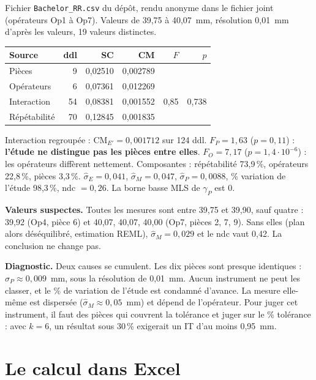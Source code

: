 \documentclass[11pt,a4paper]{article}
\theoremstyle{sj}
\theoremstyle{definition}
\theoremstyle{remark}
\newcommand{\CM}{\mathrm{CM}}
\newcommand{\gP}{\gamma_P}
\begin{document}
Fichier \texttt{Bachelor\_RR.csv} du dépôt, rendu anonyme dans le fichier joint  (opérateurs Op1 à Op7). Valeurs de 39,75 à 40,07~mm, résolution 0,01~mm d'après les valeurs, 19 valeurs distinctes.

\begin{center}
\begin{tabular}{l r r r r r}
\toprule
Source & ddl & SC & CM & $F$ & $p$\\
\midrule
Pièces & 9 & 0,02510 & 0,002789 & &\\
Opérateurs & 6 & 0,07361 & 0,012269 & &\\
Interaction & 54 & 0,08381 & 0,001552 & 0,85 & 0,738\\
Répétabilité & 70 & 0,12845 & 0,001835 & &\\
\bottomrule
\end{tabular}
\end{center}

Interaction regroupée : $\CM_{E'}=0{,}001712$ sur 124 ddl. $F_P=1{,}63$ ($p=0{,}11$) : \textbf{l'étude ne distingue pas les pièces entre elles}. $F_O=7{,}17$ ($p=1{,}4\cdot10^{-6}$) : les opérateurs diffèrent nettement. Composantes : répétabilité 73,9\,\%, opérateurs 22,8\,\%, pièces 3,3\,\%. $\hat\sigma_E=0{,}041$, $\hat\sigma_M=0{,}047$, $\hat\sigma_P=0{,}0088$, \% variation de l'étude 98,3\,\%, ndc $=0{,}26$. La borne basse MLS de $\gP$ est 0.

\textbf{Valeurs suspectes.} Toutes les mesures sont entre 39,75 et 39,90, sauf quatre : 39,92 (Op4, pièce 6) et 40,07, 40,07, 40,00 (Op7, pièces 2, 7, 9). Sans elles (plan alors déséquilibré, estimation REML), $\hat\sigma_M=0{,}029$ et le ndc vaut 0,42. La conclusion ne change pas.

\textbf{Diagnostic.} Deux causes se cumulent. Les dix pièces sont presque identiques : $\hat\sigma_P\approx0{,}009$~mm, sous la résolution de 0,01~mm. Aucun instrument ne peut les classer, et le \% de variation de l'étude est condamné d'avance. La mesure elle-même est dispersée ($\hat\sigma_M\approx0{,}05$~mm) et dépend de l'opérateur. Pour juger cet instrument, il faut des pièces qui couvrent la tolérance et juger sur le \% tolérance : avec $k=6$, un résultat sous 30\,\% exigerait un IT d'au moins 0,95~mm.

\section{Le calcul dans Excel}\label{sec:excel}
\end{document}
